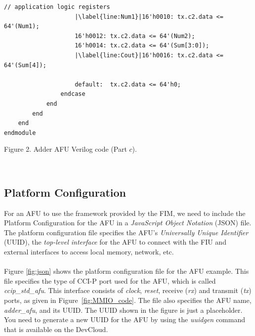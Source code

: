 \documentclass[11pt, twoside, pdftex]{article}
\begin{document}
\begin{minipage}[h]{17 cm}
\begin{lstlisting}[name=AFU]
                    // application logic registers
                    |\label{line:Num1}|16'h0010: tx.c2.data <= 64'(Num1);
                    16'h0012: tx.c2.data <= 64'(Num2);
                    16'h0014: tx.c2.data <= 64'(Sum[3:0]);
                    |\label{line:Cout}|16'h0016: tx.c2.data <= 64'(Sum[4]);

                    default:  tx.c2.data <= 64'h0;
                endcase
            end
        end
    end
endmodule
\end{lstlisting}
\begin{center}
Figure 2. Adder AFU Verilog code (Part $c$).
\end{center}
\end{minipage}

~\\
\subsection{Platform Configuration}
For an AFU to use the framework provided by the FIM, we need to include the Platform Configuration for the AFU in a {\it JavaScript Object Notation} (JSON) file. The platform configuration file specifies the AFU's  {\it Universally Unique Identifier} (UUID), the {\it top-level interface} for the AFU to connect with the FIU and external interfaces to access local memory, network, etc. \\
\\
Figure \ref{fig:json} shows the platform configuration file for the AFU example. This file specifies the type of CCI-P port used for the AFU, which is called {\it ccip\_std\_afu}.  This interface consists of 
{\it clock}, {\it reset}, receive ({\it rx}) and transmit ({\it tx}) ports, as given 
in Figure~\ref{fig:MMIO_code}. The file also specifies the AFU name, {\it adder\_afu}, and its UUID. The UUID shown in the figure is just a placeholder. You need to generate a new UUID for the AFU by using the {\it uuidgen} command that is available on the DevCloud.
\end{document}

